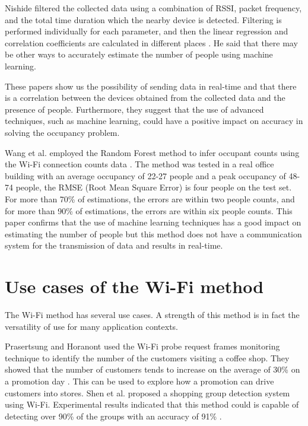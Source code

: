 Nishide filtered the collected data using a combination of RSSI, packet frequency, and the total time duration which the nearby device is detected. Filtering is performed individually for each parameter, and then the linear regression and correlation coefficients are calculated in different places \cite{nishide2019filter}. He said that there may be other ways to accurately estimate the number of people using machine learning.

These papers show us the possibility of sending data in real-time and that there is a correlation between the devices obtained from the collected data and the presence of people. Furthermore, they suggest that the use of advanced techniques, such as machine learning, could have a positive impact on accuracy in solving the occupancy problem.

Wang et al. employed the Random Forest method to infer occupant counts using the Wi-Fi connection counts data \cite{wang2019inferring}. The method was tested in a real office building with an average occupancy of 22-27 people and a peak occupancy of 48-74 people, the RMSE (Root Mean Square Error) is four people on the test set. For more than 70\% of estimations, the errors are within two people counts, and for more than 90\% of estimations, the errors are within six people counts.
This paper confirms that the use of machine learning techniques has a good impact on estimating the number of people but this method does not have a communication system for the transmission of data and results in real-time.


\section{Use cases of the Wi-Fi method}
\label{sec:cases}
\vspace{0.2 cm}

The Wi-Fi method has several use cases. A strength of this method is in fact the versatility of use for many application contexts.

Prasertsung and Horanont used the Wi-Fi probe request frames monitoring technique to identify the number of the customers visiting a coffee shop. They showed that the number of customers tends to increase on the average of 30\% on a promotion day \cite{prasertsung2017does}. This can be used to explore how a promotion can drive customers into stores.
Shen et al. proposed a shopping group detection system using Wi-Fi. Experimental results indicated that this method could is capable of detecting over 90\% of the groups with an accuracy of 91\% \cite{shen2018snow}.

